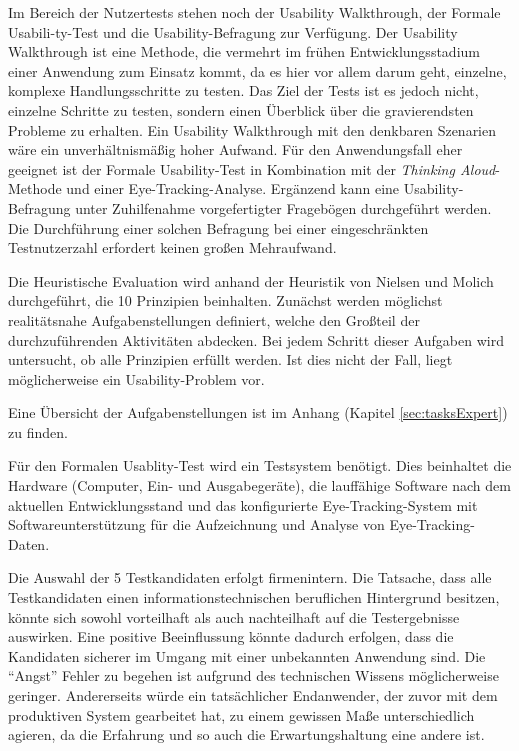 Im Bereich der Nutzertests stehen noch der Usability Walkthrough, der Formale Usabili-ty-Test und die Usability-Befragung zur Verfügung. Der Usability Walkthrough ist eine Methode, die vermehrt im frühen Entwicklungsstadium einer Anwendung zum Einsatz kommt, da es hier vor allem darum geht, einzelne, komplexe Handlungsschritte zu testen. Das Ziel der Tests ist es jedoch nicht, einzelne Schritte zu testen, sondern einen Überblick über die gravierendsten Probleme zu erhalten. Ein Usability Walkthrough mit den denkbaren Szenarien wäre ein unverhältnismäßig hoher Aufwand. Für den Anwendungsfall eher geeignet ist der Formale Usability-Test in Kombination mit der \textit{Thinking Aloud}-Methode und einer Eye-Tracking-Analyse. Ergänzend kann eine Usability-Befragung unter Zuhilfenahme vorgefertigter Fragebögen durchgeführt werden. Die Durchführung einer solchen Befragung bei einer eingeschränkten Testnutzerzahl erfordert keinen großen Mehraufwand.\par
{}
Die Heuristische Evaluation wird anhand der Heuristik von Nielsen und Molich durchgeführt, die 10 Prinzipien beinhalten.\cite[S. 233]{Moser2012} Zunächst werden möglichst realitätsnahe Aufgabenstellungen definiert, welche den Großteil der durchzuführenden Aktivitäten abdecken. Bei jedem Schritt dieser Aufgaben wird untersucht, ob alle Prinzipien erfüllt werden. Ist dies nicht der Fall, liegt möglicherweise ein Usability-Problem vor.\par
Eine Übersicht der Aufgabenstellungen ist im Anhang (Kapitel \ref{sec:tasksExpert}) zu finden.\par
{}
Für den Formalen Usablity-Test wird ein Testsystem benötigt. Dies beinhaltet die Hardware (Computer, Ein- und Ausgabegeräte), die lauffähige Software nach dem aktuellen Entwicklungsstand und das konfigurierte Eye-Tracking-System mit Softwareunterstützung für die Aufzeichnung und Analyse von Eye-Tracking-Daten.%
\par
Die Auswahl der 5 Testkandidaten erfolgt firmenintern. Die Tatsache, dass alle Testkandidaten einen informationstechnischen beruflichen Hintergrund besitzen, könnte sich sowohl vorteilhaft als auch nachteilhaft auf die Testergebnisse auswirken. Eine positive Beeinflussung könnte dadurch erfolgen, dass die Kandidaten sicherer im Umgang mit einer unbekannten Anwendung sind. Die \enquote{Angst} Fehler zu begehen ist aufgrund des technischen Wissens möglicherweise geringer. Andererseits würde ein tatsächlicher Endanwender, der zuvor mit dem produktiven System gearbeitet hat, zu einem gewissen Maße unterschiedlich agieren, da die Erfahrung und so auch die Erwartungshaltung eine andere ist.\par
